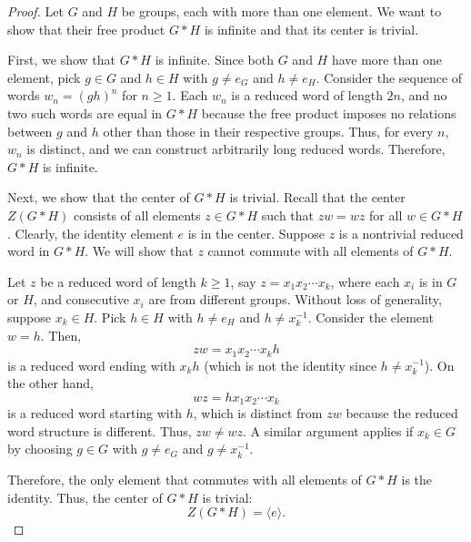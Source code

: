 \documentclass{article}
\begin{document}
\begin{proof}
    Let $G$ and $H$ be groups, each with more than one element. We want to show that their free product $G * H$ is infinite and that its center is trivial.

    First, we show that $G * H$ is infinite. 
    Since both $G$ and $H$ have more than one element, pick $g \in G$ and $h \in H$ with $g \neq e_G$ and $h \neq e_H$. Consider the sequence of words $w_n = (g h)^n$ for $n \geq 1$. Each $w_n$ is a reduced word of length $2n$, and no two such words are equal in $G * H$ because the free product imposes no relations between $g$ and $h$ other than those in their respective groups. Thus, for every $n$, $w_n$ is distinct, and we can construct arbitrarily long reduced words. Therefore, $G * H$ is infinite.

    Next, we show that the center of $G * H$ is trivial. Recall that the center $Z(G * H)$ consists of all elements $z \in G * H$ such that $z w = w z$ for all $w \in G * H$. Clearly, the identity element $e$ is in the center. Suppose $z$ is a nontrivial reduced word in $G * H$. We will show that $z$ cannot commute with all elements of $G * H$.

    Let $z$ be a reduced word of length $k \geq 1$, say $z = x_1 x_2 \cdots x_k$, where each $x_i$ is in $G$ or $H$, and consecutive $x_i$ are from different groups. Without loss of generality, suppose $x_k \in H$. Pick $h \in H$ with $h \neq e_H$ and $h \neq x_k^{-1}$. Consider the element $w = h$. Then,
    \[
    z w = x_1 x_2 \cdots x_k h
    \]
    is a reduced word ending with $x_k h$ (which is not the identity since $h \neq x_k^{-1}$). On the other hand,
    \[
    w z = h x_1 x_2 \cdots x_k
    \]
    is a reduced word starting with $h$, which is distinct from $z w$ because the reduced word structure is different. Thus, $z w \neq w z$. A similar argument applies if $x_k \in G$ by choosing $g \in G$ with $g \neq e_G$ and $g \neq x_k^{-1}$.

    Therefore, the only element that commutes with all elements of $G * H$ is the identity. Thus, the center of $G * H$ is trivial:
    \[
    Z(G * H) = \langle e \rangle.
    \]
\end{proof}
\end{document}
